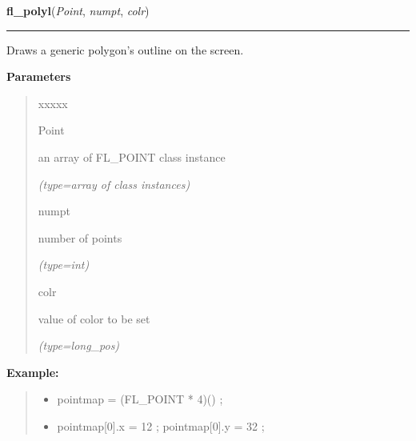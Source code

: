     \label{xformslib:flxbasic:fl_polyl}

    \vspace{0.5ex}

\hspace{.8\funcindent}\begin{boxedminipage}{\funcwidth}

    \raggedright \textbf{fl\_polyl}(\textit{Point}, \textit{numpt}, \textit{colr})

    \vspace{-1.5ex}

    \rule{\textwidth}{0.5\fboxrule}
\setlength{\parskip}{2ex}
    Draws a generic polygon's outline on the screen.

\setlength{\parskip}{1ex}
      \textbf{Parameters}
      \vspace{-1ex}

      \begin{quote}
        \begin{Ventry}{xxxxx}

          \item[Point]

          an array of FL\_POINT class instance

            {\it (type=array of class instances)}

          \item[numpt]

          number of points

            {\it (type=int)}

          \item[colr]

          value of color to be set

            {\it (type=long\_pos)}

        \end{Ventry}

      \end{quote}

\textbf{Example:}
\begin{quote}
  \begin{itemize}

  \item
    \setlength{\parskip}{0.6ex}
pointmap = (FL\_POINT * 4)() ;



  \item pointmap[0].x = 12 ; pointmap[0].y = 32 ;




\end{itemize}
\end{quote}
\end{boxedminipage}
